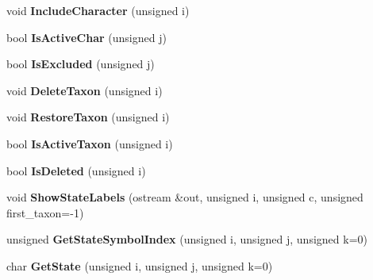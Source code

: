 \begin{DoxyCompactItemize}
\item 
\hypertarget{classNxsCharactersBlock_a77cae32fe241edccb568c974f84f4d6e}{
void {\bfseries IncludeCharacter} (unsigned i)}
\label{classNxsCharactersBlock_a77cae32fe241edccb568c974f84f4d6e}

\item 
\hypertarget{classNxsCharactersBlock_a25aae5cc0a427e49584f3a9413ac3d08}{
bool {\bfseries IsActiveChar} (unsigned j)}
\label{classNxsCharactersBlock_a25aae5cc0a427e49584f3a9413ac3d08}

\item 
\hypertarget{classNxsCharactersBlock_afa5db060aaac010e1715f4e4f4e0c280}{
bool {\bfseries IsExcluded} (unsigned j)}
\label{classNxsCharactersBlock_afa5db060aaac010e1715f4e4f4e0c280}

\item 
\hypertarget{classNxsCharactersBlock_a9b5e518a17c0faf5fc74e08bef824747}{
void {\bfseries DeleteTaxon} (unsigned i)}
\label{classNxsCharactersBlock_a9b5e518a17c0faf5fc74e08bef824747}

\item 
\hypertarget{classNxsCharactersBlock_a9d70d4f161d881b06c6321a7a6c0d18c}{
void {\bfseries RestoreTaxon} (unsigned i)}
\label{classNxsCharactersBlock_a9d70d4f161d881b06c6321a7a6c0d18c}

\item 
\hypertarget{classNxsCharactersBlock_afb7e89237e90c6012fb43144ce676f2a}{
bool {\bfseries IsActiveTaxon} (unsigned i)}
\label{classNxsCharactersBlock_afb7e89237e90c6012fb43144ce676f2a}

\item 
\hypertarget{classNxsCharactersBlock_abaf10f1fcc54eff6db1f9feba225b31a}{
bool {\bfseries IsDeleted} (unsigned i)}
\label{classNxsCharactersBlock_abaf10f1fcc54eff6db1f9feba225b31a}

\item 
\hypertarget{classNxsCharactersBlock_a3ec722e8713bac7824a4fda5de072722}{
void {\bfseries ShowStateLabels} (ostream \&out, unsigned i, unsigned c, unsigned first\_\-taxon=-\/1)}
\label{classNxsCharactersBlock_a3ec722e8713bac7824a4fda5de072722}

\item 
\hypertarget{classNxsCharactersBlock_a7331c7b7cd5bf5a3dfc43adf0efd4e40}{
unsigned {\bfseries GetStateSymbolIndex} (unsigned i, unsigned j, unsigned k=0)}
\label{classNxsCharactersBlock_a7331c7b7cd5bf5a3dfc43adf0efd4e40}

\item 
\hypertarget{classNxsCharactersBlock_a5109912828413e406a0884db25625923}{
char {\bfseries GetState} (unsigned i, unsigned j, unsigned k=0)}
\label{classNxsCharactersBlock_a5109912828413e406a0884db25625923}


\end{DoxyCompactItemize}
